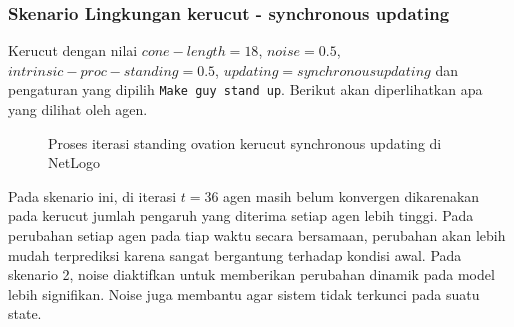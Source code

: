 \subsubsection{Skenario Lingkungan kerucut - synchronous updating}

Kerucut dengan nilai $cone-length=18$, $noise=0.5$, $intrinsic-proc-standing=0.5$, $updating= synchronous updating$ dan pengaturan yang dipilih \texttt{Make guy stand up}. Berikut akan diperlihatkan apa yang dilihat oleh agen.

\begin{figure}[H]
	\centering
	\hfill
	\hfill
	\hfill
	\caption{Proses iterasi standing ovation kerucut synchronous updating di NetLogo}
	\label{fig:proses_sop_kerucut_sync}
\end{figure}

Pada skenario ini, di iterasi $t=36$ agen masih belum konvergen dikarenakan pada kerucut jumlah pengaruh yang diterima setiap agen lebih tinggi. Pada perubahan setiap agen pada tiap waktu secara bersamaan, perubahan akan lebih mudah terprediksi karena sangat bergantung terhadap kondisi awal. Pada skenario 2, noise diaktifkan untuk memberikan perubahan dinamik pada model lebih signifikan. Noise juga membantu agar sistem tidak terkunci pada suatu state.

